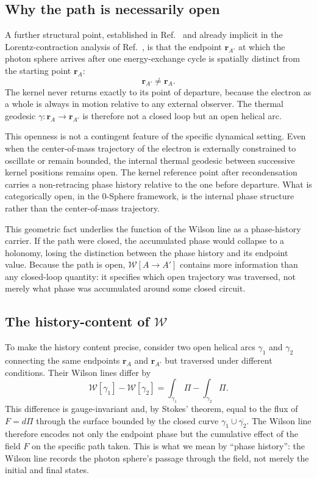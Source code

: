 \documentclass[%
 reprint, amsmath,amssymb, aps, prb, ]{revtex4-2}
\numberwithin{equation}{section}
\newcommand{\WL}{\mathcal{W}}
\begin{document}
\subsection{Why the path is necessarily open}

A further structural point, established in Ref.~\cite{hanamura43} and already implicit in the Lorentz-contraction analysis of Ref.~\cite{hanamura47}, is that the endpoint $\mathbf{r}_{A'}$ at which the photon sphere arrives after one energy-exchange cycle is spatially distinct from the starting point $\mathbf{r}_A$:
\begin{equation}
\mathbf{r}_{A'} \neq \mathbf{r}_A.
\label{eq:open}
\end{equation}
The kernel never returns exactly to its point of departure, because the electron as a whole is always in motion relative to any external observer. The thermal geodesic $\gamma: \mathbf{r}_A \to \mathbf{r}_{A'}$ is therefore not a closed loop but an open helical arc.

This openness is not a contingent feature of the specific dynamical setting. Even when the center-of-mass trajectory of the electron is externally constrained to oscillate or remain bounded, the internal thermal geodesic between successive kernel positions remains open. The kernel reference point after recondensation carries a non-retracing phase history relative to the one before departure. What is categorically open, in the 0-Sphere framework, is the internal phase structure rather than the center-of-mass trajectory.

This geometric fact underlies the function of the Wilson line as a phase-history carrier. If the path were closed, the accumulated phase would collapse to a holonomy, losing the distinction between the phase history and its endpoint value. Because the path is open, $\WL[A\to A']$ contains more information than any closed-loop quantity: it specifies which open trajectory was traversed, not merely what phase was accumulated around some closed circuit.

\subsection{The history-content of $\WL$}

To make the history content precise, consider two open helical arcs $\gamma_1$ and $\gamma_2$ connecting the same endpoints $\mathbf{r}_A$ and $\mathbf{r}_{A'}$ but traversed under different conditions. Their Wilson lines differ by
\begin{equation}
\WL[\gamma_1] - \WL[\gamma_2] = \int_{\gamma_1} \Pi - \int_{\gamma_2} \Pi.
\label{eq:history_diff}
\end{equation}
This difference is gauge-invariant and, by Stokes' theorem, equal to the flux of $F = d\Pi$ through the surface bounded by the closed curve $\gamma_1 \cup \overline{\gamma_2}$. The Wilson line therefore encodes not only the endpoint phase but the cumulative effect of the field $F$ on the specific path taken. This is what we mean by ``phase history'': the Wilson line records the photon sphere's passage through the field, not merely the initial and final states.
\end{document}
